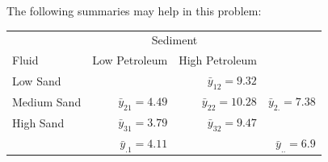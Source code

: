 \documentclass[addpoints]{examsetup}\usepackage[]{graphicx}\usepackage[]{color}
\begin{document}
\begin{questions}
The following summaries may help in this problem:




\begin{table}[h]
\centering
\begin{tabular}{lrrr}
 & \multicolumn{2}{c}{Sediment} \\
\cline{2-3}
Fluid & Low Petroleum & High Petroleum \\ \cline{1-3} \cline{1-3}
Low Sand &                              & $\bar{y}_{12} = 9.32$  &  \\
Medium Sand & $\bar{y}_{21} = 4.49$ & $\bar{y}_{22} = 10.28$  & $\bar{y}_{2.} = 7.38$ \\
High Sand & $\bar{y}_{31} = 3.79$ & $\bar{y}_{32} = 9.47$  &  \\ \cline{1-3}
& $\bar{y}_{.1} = 4.11$ &   & $\bar{y}_{..} = 6.9$ \\
\end{tabular}
\end{table}


\vspace{1cm}

\end{questions}
\end{document}
